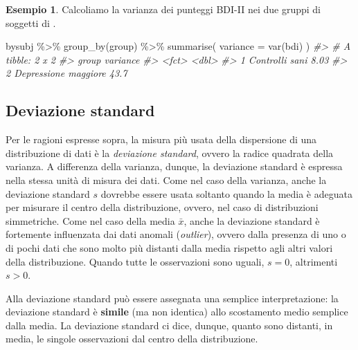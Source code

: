\documentclass[
  10pt,
  italian,
  a4paper,
  extrafontsizes,onecolumn,openright
  ]{memoir}
\newenvironment{Shaded}{\begin{snugshade}}{\end{snugshade}}
\newcommand{\AttributeTok}[1]{\textcolor[rgb]{0.77,0.63,0.00}{#1}}
\newcommand{\CommentTok}[1]{\textcolor[rgb]{0.56,0.35,0.01}{\textit{#1}}}
\newcommand{\FunctionTok}[1]{\textcolor[rgb]{0.00,0.00,0.00}{#1}}
\newcommand{\NormalTok}[1]{#1}
\newcommand{\SpecialCharTok}[1]{\textcolor[rgb]{0.00,0.00,0.00}{#1}}
\theoremstyle{definition}
\theoremstyle{definition}
\newtheorem{example}{Esempio}[chapter]
\theoremstyle{definition}
\theoremstyle{definition}
\theoremstyle{remark}
\begin{document}
\begin{example}

Calcoliamo la varianza dei punteggi BDI-II nei due gruppi di soggetti di \textcite{zetschefuture2019}.

\begin{Shaded}
\begin{Highlighting}[]
\NormalTok{bysubj }\SpecialCharTok{\%\textgreater{}\%} 
  \FunctionTok{group\_by}\NormalTok{(group) }\SpecialCharTok{\%\textgreater{}\%} 
  \FunctionTok{summarise}\NormalTok{(}
    \AttributeTok{variance =} \FunctionTok{var}\NormalTok{(bdi)}
\NormalTok{  ) }
\CommentTok{\#\textgreater{} \# A tibble: 2 x 2}
\CommentTok{\#\textgreater{}   group                variance}
\CommentTok{\#\textgreater{}   \textless{}fct\textgreater{}                   \textless{}dbl\textgreater{}}
\CommentTok{\#\textgreater{} 1 Controlli sani           8.03}
\CommentTok{\#\textgreater{} 2 Depressione maggiore    43.7}
\end{Highlighting}
\end{Shaded}

\end{example}

\hypertarget{deviazione-standard}{%
\subsection{Deviazione standard}\label{deviazione-standard}}

Per le ragioni espresse sopra, la misura più usata della dispersione di una distribuzione di dati è la \emph{deviazione standard}, ovvero la radice quadrata della varianza. A differenza della varianza, dunque, la deviazione standard è espressa nella stessa unità di misura dei dati. Come nel caso della varianza, anche la deviazione standard \(s\) dovrebbe essere usata soltanto quando la media è adeguata per misurare il centro della distribuzione, ovvero, nel caso di distribuzioni simmetriche. Come nel caso della media \(\bar{x}\), anche la deviazione standard è fortemente influenzata dai dati anomali (\emph{outlier}), ovvero dalla presenza di uno o di pochi dati che sono molto più distanti dalla media rispetto agli altri valori della distribuzione. Quando tutte le osservazioni sono uguali, \(s=0\), altrimenti \(s > 0\).

Alla deviazione standard può essere assegnata una semplice interpretazione: la deviazione standard è \textbf{simile} (ma non identica) allo scostamento medio semplice dalla media. La deviazione standard ci dice, dunque, quanto sono distanti, in media, le singole osservazioni dal centro della distribuzione.
\end{document}
